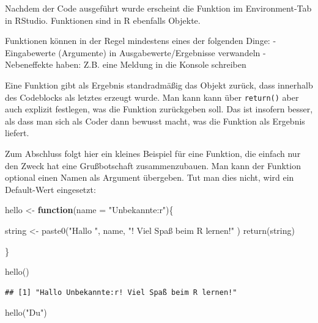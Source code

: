 \documentclass[
]{book}
\newenvironment{Shaded}{\begin{snugshade}}{\end{snugshade}}
\newcommand{\AttributeTok}[1]{\textcolor[rgb]{0.77,0.63,0.00}{#1}}
\newcommand{\ControlFlowTok}[1]{\textcolor[rgb]{0.13,0.29,0.53}{\textbf{#1}}}
\newcommand{\FunctionTok}[1]{\textcolor[rgb]{0.00,0.00,0.00}{#1}}
\newcommand{\NormalTok}[1]{#1}
\newcommand{\OtherTok}[1]{\textcolor[rgb]{0.56,0.35,0.01}{#1}}
\newcommand{\StringTok}[1]{\textcolor[rgb]{0.31,0.60,0.02}{#1}}
\begin{document}
Nachdem der Code ausgeführt wurde erscheint die Funktion im Environment-Tab in RStudio. Funktionen sind in R ebenfalls Objekte.

Funktionen können in der Regel mindestens eines der folgenden Dinge:
- Eingabewerte (Argumente) in Ausgabewerte/Ergebnisse verwandeln
- Nebeneffekte haben: Z.B. eine Meldung in die Konsole schreiben

Eine Funktion gibt als Ergebnis standradmäßig das Objekt zurück, dass innerhalb des Codeblocks als letztes erzeugt wurde. Man kann kann über \texttt{return()} aber auch explizit festlegen, was die Funktion zurückgeben soll. Das ist insofern besser, als dass man sich als Coder dann bewusst macht, was die Funktion als Ergebnis liefert.

Zum Abschluss folgt hier ein kleines Beispiel für eine Funktion, die einfach nur den Zweck hat eine Grußbotschaft zusammenzubauen. Man kann der Funktion optional einen Namen als Argument übergeben. Tut man dies nicht, wird ein Default-Wert eingesetzt:

\begin{Shaded}
\begin{Highlighting}[]
\NormalTok{hello }\OtherTok{\textless{}{-}} \ControlFlowTok{function}\NormalTok{(}\AttributeTok{name =} \StringTok{"Unbekannte:r"}\NormalTok{)\{}
  
\NormalTok{  string }\OtherTok{\textless{}{-}} \FunctionTok{paste0}\NormalTok{(}\StringTok{"Hallo "}\NormalTok{, name, }\StringTok{"! Viel Spaß beim R lernen!"}\NormalTok{ )}
  \FunctionTok{return}\NormalTok{(string)}
  
\NormalTok{\}}
\end{Highlighting}
\end{Shaded}

\begin{Shaded}
\begin{Highlighting}[]
\FunctionTok{hello}\NormalTok{()}
\end{Highlighting}
\end{Shaded}

\begin{verbatim}
## [1] "Hallo Unbekannte:r! Viel Spaß beim R lernen!"
\end{verbatim}

\begin{Shaded}
\begin{Highlighting}[]
\FunctionTok{hello}\NormalTok{(}\StringTok{"Du"}\NormalTok{)}
\end{Highlighting}
\end{Shaded}
\end{document}
